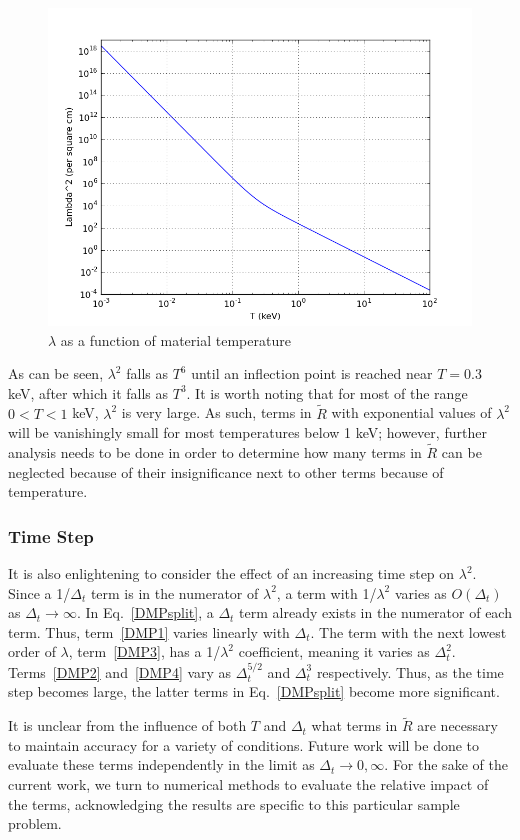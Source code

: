 \begin{figure}[htb]
\centering
\includegraphics[width=0.7\linewidth]{graphics/lambdaT}
\caption{$\lambda$ as a function of material temperature}
\label{lambdaT}
\end{figure}
As can be seen, $\lambda^2$ falls as $T^6$ until an inflection point is reached
near $T=0.3$ keV, after which it falls as $T^3$.  It is worth noting that for
most of the range $0<T<1$ keV, $\lambda^2$ is very large.  As such, terms in
$\tilde R$ with exponential values of $\lambda^2$ will be vanishingly small for
most temperatures below 1 keV; however, further analysis needs to be done in
order to determine how many terms in $\tilde R$ can be neglected because of
their insignificance next to other terms because of temperature.


\subsubsection{Time Step}
It is also enlightening to consider the effect of an increasing time step on
$\lambda^2$.  Since a 1/$\Delta_t$ term is in the numerator of $\lambda^2$, a
term with 1/$\lambda^2$ varies as $O(\Delta_t)$ as $\Delta_t \to \infty$.  In
Eq.\
\eqref{DMPsplit}, a $\Delta_t$ term already exists in the numerator of each
term.
Thus, term\ \eqref{DMP1} varies linearly with $\Delta_t$.  The term with the
next lowest order of $\lambda$, term\ \eqref{DMP3}, has a 1/$\lambda^2$
coefficient, meaning it varies as $\Delta_t^2$.  Terms\ \eqref{DMP2} and\
\eqref{DMP4} vary as $\Delta_t^{5/2}$ and $\Delta_t^3$ respectively.  Thus, as
the time step becomes large, the latter terms in Eq.\ \eqref{DMPsplit} become
more significant.

It is unclear from the influence of both $T$ and $\Delta_t$ what terms in
$\tilde R$ are necessary to maintain accuracy for a variety of conditions. 
Future work will be done to evaluate these terms independently in the limit as
$\Delta_t\to 0, \infty$.  For the sake of the current work,
we turn to numerical methods to evaluate the relative impact of the terms,
acknowledging the results are specific to this particular sample problem.

